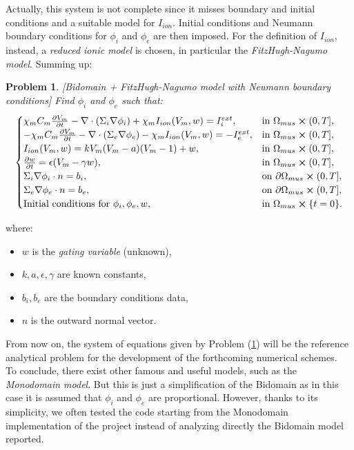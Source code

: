 \documentclass[a4paper,11pt]{article}
\newtheorem{problem}{Problem}
\begin{document}
    \vspace{4mm}
    \noindent Actually, this system is not complete since it misses boundary and initial conditions and a suitable model for $I_{ion}$. Initial conditions and Neumann boundary conditions for $\phi_i$ and $\phi_e$ are then imposed. For the definition of $I_{ion}$, instead, a \emph{reduced ionic model} is chosen, in particular the \emph{FitzHugh-Nagumo model}. Summing up:\newpage
        \begin{problem}\label{def1}[Bidomain + FitzHugh-Nagumo model with Neumann boundary conditions]
      	Find $\phi_i$ and $\phi_e$ such that:
    	\begin{equation*}
    	\begin{cases}
    	\chi_m C_m\pdv{V_m}{t} - \nabla \cdot (\Sigma_i \nabla \phi_i) + \chi_m I_{ion}(V_m,w) = I_i^{ext},    & \text{in } \Omega_{mus} \cross (0,T],
    	\\
    	-\chi_m C_m\pdv{V_m}{t} - \nabla \cdot (\Sigma_e \nabla \phi_e) - \chi_m I_{ion}(V_m,w) = -I_e^{ext},    & \text{in } \Omega_{mus} \cross (0,T],
    	\\
    	I_{ion}(V_m,w)=kV_m(V_m-a)(V_m-1)+w, & \text{in } \Omega_{mus} \cross (0,T],
    	\\
    	\pdv{w}{t} = \epsilon(V_m-\gamma w),  & \text{in } \Omega_{mus} \cross (0,T],
    	\\
    	\Sigma_i\nabla \phi_i \cdot n = b_i,   & \text{on } \partial \Omega_{mus} \cross (0,T],
    	\\
    	\Sigma_e\nabla \phi_e \cdot n = b_e,   & \text{on } \partial \Omega_{mus} \cross (0,T],
    	\\
    	\text{Initial conditions for } \phi_i,\phi_e, w, & \text{in } \Omega_{mus}\cross\{t=0\}.
    	\end{cases}
    	\end{equation*}
    	\end{problem}
    \vspace{3mm}
    where:
    \begin{itemize}[label=\textendash]
    	\item $w$ is the \emph{gating variable} (unknown),
    	\item $k,a,\epsilon,\gamma$ are known constants,
    	\item $b_i,b_e$ are the boundary conditions data,
    	\item $n$ is the outward normal vector.
    \end{itemize}

    \vspace{4mm}
    \noindent From now on, the system of equations given by Problem (\ref{def1}) will be the reference analytical problem for the development of the forthcoming numerical schemes.\\
    To conclude, there exist other famous and useful models, such as the \emph{Monodomain model}. But this is just a simplification of the Bidomain as in this case it is assumed that $\phi_i$ and $\phi_e$ are proportional. However, thanks to its simplicity, we often tested the code starting from the Monodomain implementation of the project \cite{andreotti} instead of analyzing directly the Bidomain model reported.
\end{document}
